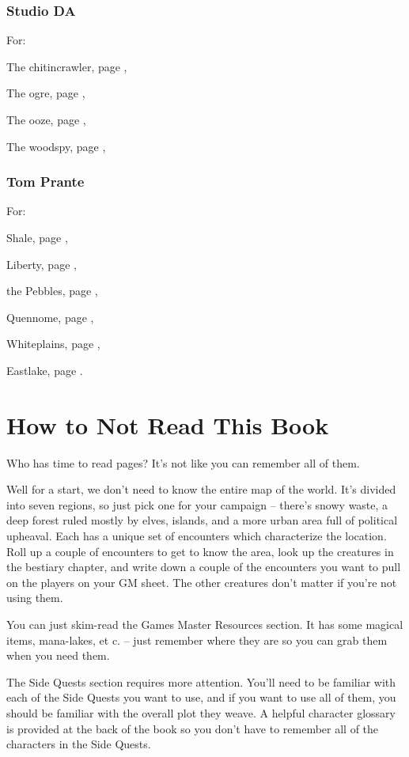 \begin{multicols}{2}
\subsubsection{Studio DA}

For:

The chitincrawler, page \pageref{da:chitincrawler},

The ogre, page \pageref{da:ogre},

The ooze, page \pageref{da:jelly},

The woodspy, page \pageref{da:woodspy},

\subsubsection{Tom Prante}

For:

Shale, page \pageref{tom:autumn},

Liberty, page \pageref{tom:swamp},

the Pebbles, page \pageref{tom:pebbles},

Quennome, page \pageref{tom:quen},

Whiteplains, page \pageref{tom:whiteplains},

Eastlake, page \pageref{tom:winter}.

\end{multicols}

\section*{How to Not Read This Book}

\begin{multicols}{2}

\noindent Who has time to read \pageref{lastpage} pages?  It's not like you can remember all of them.

Well for a start, we don't need to know the entire map of the world.
It's divided into seven regions, so just pick one for your campaign -- there's snowy waste, a deep forest ruled mostly by elves, islands, and a more urban area full of political upheaval.
Each has a unique set of encounters which characterize the location.
Roll up a couple of encounters to get to know the area, look up the creatures in the bestiary chapter, and write down a couple of the encounters you want to pull on the players on your GM sheet.
The other creatures don't matter if you're not using them.

You can just skim-read the Games Master Resources section.
It has some magical items, mana-lakes, et c. -- just remember where they are so you can grab them when you need them.

The Side Quests section requires more attention.
You'll need to be familiar with each of the Side Quests you want to use, and if you want to use all of them, you should be familiar with the overall plot they weave.
A helpful character glossary is provided at the back of the book so you don't have to remember all of the characters in the Side Quests.

\end{multicols}

